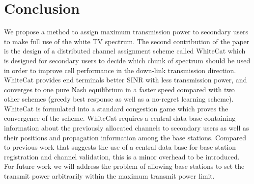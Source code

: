\section{Conclusion}
We propose a method to assign maximum transmission power to secondary users to make full use of the white TV spectrum. The second contribution of the paper is the design of a distributed channel assignment scheme called WhiteCat which is designed for secondary users to decide which chunk of spectrum should be used in order to improve cell performance in the down-link transmission direction. WhiteCat provides end terminals better SINR with less transmission power, and converges to one pure Nash equilibrium in a faster speed compared with two other schemes (greedy best response as well as a no-regret learning scheme). WhiteCat is formulated into a standard congestion game which proves the convergence of the scheme. WhiteCat requires a central data base containing information about the previously allocated channels to secondary users as well as their positions and propagation information among the base stations. Compared to previous work that suggests the use of a central data base for base station registration and channel validation, this is a minor overhead to be introduced. 
For future work we will address the problem of allowing base stations to set the transmit power arbitrarily within the maximum transmit power limit. 

